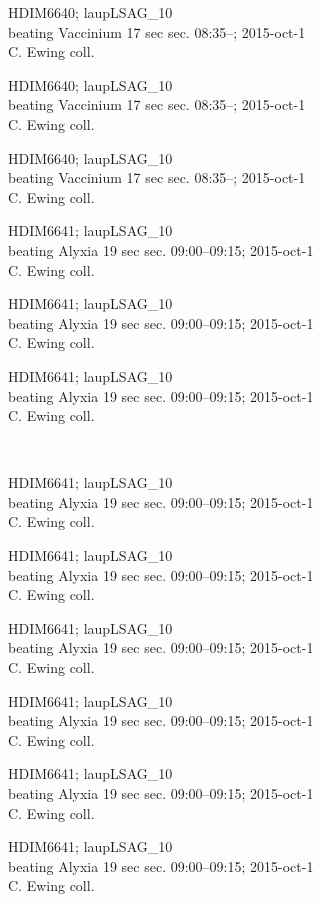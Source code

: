 \documentclass[2pt]{extarticle}
\begin{document}
\noindent
\parbox{0.16\textwidth}{\tiny \raggedright \rule[-0.3\baselineskip]{0pt}{10pt}HDIM6640; laupLSAG\_10\\ beating Vaccinium 17 sec sec. 08:35--; 2015-oct-1\\ C. Ewing coll.}
\parbox{0.16\textwidth}{\tiny \raggedright \rule[-0.3\baselineskip]{0pt}{10pt}HDIM6640; laupLSAG\_10\\ beating Vaccinium 17 sec sec. 08:35--; 2015-oct-1\\ C. Ewing coll.}
\parbox{0.16\textwidth}{\tiny \raggedright \rule[-0.3\baselineskip]{0pt}{10pt}HDIM6640; laupLSAG\_10\\ beating Vaccinium 17 sec sec. 08:35--; 2015-oct-1\\ C. Ewing coll.}
\parbox{0.16\textwidth}{\tiny \raggedright \rule[-0.3\baselineskip]{0pt}{10pt}HDIM6641; laupLSAG\_10\\ beating Alyxia 19 sec sec. 09:00--09:15; 2015-oct-1\\ C. Ewing coll.}
\parbox{0.16\textwidth}{\tiny \raggedright \rule[-0.3\baselineskip]{0pt}{10pt}HDIM6641; laupLSAG\_10\\ beating Alyxia 19 sec sec. 09:00--09:15; 2015-oct-1\\ C. Ewing coll.}
\parbox{0.16\textwidth}{\tiny \raggedright \rule[-0.3\baselineskip]{0pt}{10pt}HDIM6641; laupLSAG\_10\\ beating Alyxia 19 sec sec. 09:00--09:15; 2015-oct-1\\ C. Ewing coll.} \\ 
\vspace{0.001in} 

\noindent
\parbox{0.16\textwidth}{\tiny \raggedright \rule[-0.3\baselineskip]{0pt}{10pt}HDIM6641; laupLSAG\_10\\ beating Alyxia 19 sec sec. 09:00--09:15; 2015-oct-1\\ C. Ewing coll.}
\parbox{0.16\textwidth}{\tiny \raggedright \rule[-0.3\baselineskip]{0pt}{10pt}HDIM6641; laupLSAG\_10\\ beating Alyxia 19 sec sec. 09:00--09:15; 2015-oct-1\\ C. Ewing coll.}
\parbox{0.16\textwidth}{\tiny \raggedright \rule[-0.3\baselineskip]{0pt}{10pt}HDIM6641; laupLSAG\_10\\ beating Alyxia 19 sec sec. 09:00--09:15; 2015-oct-1\\ C. Ewing coll.}
\parbox{0.16\textwidth}{\tiny \raggedright \rule[-0.3\baselineskip]{0pt}{10pt}HDIM6641; laupLSAG\_10\\ beating Alyxia 19 sec sec. 09:00--09:15; 2015-oct-1\\ C. Ewing coll.}
\parbox{0.16\textwidth}{\tiny \raggedright \rule[-0.3\baselineskip]{0pt}{10pt}HDIM6641; laupLSAG\_10\\ beating Alyxia 19 sec sec. 09:00--09:15; 2015-oct-1\\ C. Ewing coll.}
\parbox{0.16\textwidth}{\tiny \raggedright \rule[-0.3\baselineskip]{0pt}{10pt}HDIM6641; laupLSAG\_10\\ beating Alyxia 19 sec sec. 09:00--09:15; 2015-oct-1\\ C. Ewing coll.} \\ 
\vspace{0.001in} 
\end{document}
